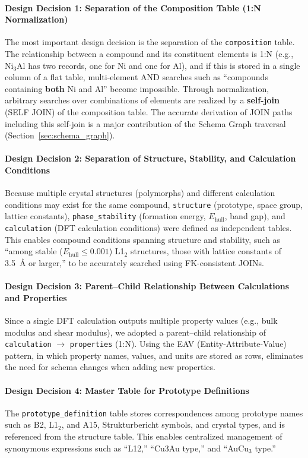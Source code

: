 \documentclass[5p,twocolumn]{elsarticle}
\begin{document}
\paragraph{Design Decision 1: Separation of the Composition Table (1:N Normalization)}
The most important design decision is the separation of the \texttt{composition} table.
The relationship between a compound and its constituent elements is 1:N
(e.g., Ni$_3$Al has two records, one for Ni and one for Al),
and if this is stored in a single column of a flat table,
multi-element AND searches such as ``compounds containing \textbf{both} Ni and Al'' become impossible.
Through normalization, arbitrary searches over combinations of elements are realized
by a \textbf{self-join} (SELF JOIN) of the composition table.
The accurate derivation of JOIN paths including this self-join is a major contribution
of the Schema Graph traversal (Section~\ref{sec:schema_graph}).

\paragraph{Design Decision 2: Separation of Structure, Stability, and Calculation Conditions}
Because multiple crystal structures (polymorphs) and different calculation conditions may exist
for the same compound,
\texttt{structure} (prototype, space group, lattice constants),
\texttt{phase\_stability} (formation energy, $E_\text{hull}$, band gap),
and \texttt{calculation} (DFT calculation conditions) were defined as independent tables.
This enables compound conditions spanning structure and stability,
such as ``among stable ($E_\text{hull} \leq 0.001$) L1$_2$ structures,
those with lattice constants of 3.5~\AA{} or larger,''
to be accurately searched using FK-consistent JOINs.

\paragraph{Design Decision 3: Parent--Child Relationship Between Calculations and Properties}
Since a single DFT calculation outputs multiple property values
(e.g., bulk modulus and shear modulus),
we adopted a parent--child relationship of \texttt{calculation} $\to$ \texttt{properties} (1:N).
Using the EAV (Entity-Attribute-Value) pattern, in which property names, values, and units are stored as rows,
eliminates the need for schema changes when adding new properties.

\paragraph{Design Decision 4: Master Table for Prototype Definitions}
The \texttt{prototype\_definition} table stores correspondences among
prototype names such as B2, L1$_2$, and A15, Strukturbericht symbols, and crystal types,
and is referenced from the structure table.
This enables centralized management of synonymous expressions such as
``L12,'' ``Cu3Au type,'' and ``AuCu$_3$ type.''
\end{document}
